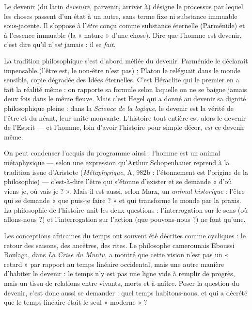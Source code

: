 \documentclass[11pt]{article}
\newcommand{\cle}[1]{{\popxbold\color{popdark}#1}}
\begin{document}
\begin{definition}[Devenir]
Le \cle{devenir} (du latin \emph{devenire}, parvenir, arriver à) désigne le processus par lequel les choses passent d'un état à un autre, sans terme fixe ni substance immuable sous-jacente. Il s'oppose à l'\emph{être} conçu comme substance éternelle (Parménide) et à l'essence immuable (la « nature » d'une chose). Dire que l'homme est devenir, c'est dire qu'il n'\emph{est} jamais : il se \emph{fait}.
\end{definition}

La tradition philosophique s'est d'abord méfiée du devenir. Parménide le déclarait impensable (l'être est, le non-être n'est pas) ; Platon le reléguait dans le monde sensible, copie dégradée des Idées éternelles. C'est Héraclite qui le premier en a fait la réalité même : on rapporte sa formule selon laquelle on ne se baigne jamais deux fois dans le même fleuve. Mais c'est Hegel qui a donné au devenir sa dignité philosophique pleine : dans la \emph{Science de la logique}, le devenir est la vérité de l'être et du néant, leur unité mouvante. L'histoire tout entière est alors le devenir de l'Esprit — et l'homme, loin d'avoir l'histoire pour simple décor, \emph{est} ce devenir même.

\begin{propriete}
On peut condenser l'acquis du programme ainsi : l'homme est un \guillemotleft animal métaphysique \guillemotright — selon une expression qu'Arthur Schopenhauer reprend à la tradition issue d'Aristote (\emph{Métaphysique}, A, 982b : l'étonnement est l'origine de la philosophie) — c'est-à-dire l'être qui s'étonne d'exister et se demande « d'où viens-je, où vais-je ? ». Mais il est aussi, selon Marx, un \emph{animal historique} : l'être qui se demande « que puis-je faire ? » et qui transforme le monde par la praxis. La philosophie de l'histoire unit les deux questions : l'interrogation sur le sens (où allons-nous ?) et l'interrogation sur l'action (que pouvons-nous ?) ne font qu'une.
\end{propriete}

\begin{savaistu}
Les conceptions africaines du temps ont souvent été décrites comme cycliques : le retour des saisons, des ancêtres, des rites. Le philosophe camerounais Eboussi Boulaga, dans \emph{La Crise du Muntu}, a montré que cette vision n'est pas un « retard » par rapport au temps linéaire occidental, mais une autre manière d'habiter le devenir : le temps n'y est pas une ligne vide à remplir de progrès, mais un tissu de relations entre vivants, morts et à-naître. Poser la question du devenir, c'est donc aussi se demander : quel temps habitons-nous, et qui a décrété que le temps linéaire était le seul « moderne » ?
\end{savaistu}
\end{document}
